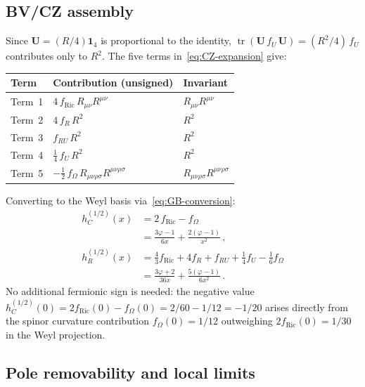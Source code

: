 \documentclass[aps,prd,twocolumn,superscriptaddress,nofootinbib,floatfix]{revtex4-2}
\theoremstyle{definition}
\theoremstyle{remark}
\newcommand{\Ricsq}{R_{\mu\nu}R^{\mu\nu}}
\newcommand{\Riemsq}{R_{\mu\nu\rho\sigma}R^{\mu\nu\rho\sigma}}
\newcommand{\tr}{\operatorname{tr}}
\begin{document}
\subsection{BV/CZ assembly}

Since $\mathbf{U} = (R/4)\mathbf{1}_4$ is proportional to the identity,
$\tr(\mathbf{U}\,f_U\,\mathbf{U}) = (R^2/4)\,f_U$ contributes only to
$R^2$. The five terms in~\eqref{eq:CZ-expansion} give:
\begin{center}
\renewcommand{\arraystretch}{1.15}
\begin{tabular}{@{}lll@{}}
  \toprule
  Term & Contribution (unsigned) & Invariant \\
  \midrule
  Term~1 & $4\,f_{\text{Ric}}\,\Ricsq$ & $\Ricsq$ \\
  Term~2 & $4\,f_R\,R^2$ & $R^2$ \\
  Term~3 & $f_{RU}\,R^2$ & $R^2$ \\
  Term~4 & $\tfrac{1}{4}\,f_U\,R^2$ & $R^2$ \\
  Term~5 & $-\tfrac{1}{2}\,f_\Omega\,\Riemsq$ & $\Riemsq$ \\
  \bottomrule
\end{tabular}
\end{center}

Converting to the Weyl basis via~\eqref{eq:GB-conversion}:
\begin{subequations}
\label{eq:dirac-ff}
\begin{align}
  h_C^{(1/2)}(x) &= 2\,f_{\text{Ric}} - f_\Omega
  \label{eq:hC12-assembly}\\
  &= \frac{3\varphi - 1}{6x} + \frac{2(\varphi - 1)}{x^2}\,,
  \label{eq:hC12}\\[4pt]
  h_R^{(1/2)}(x) &= \tfrac{4}{3}f_{\text{Ric}} + 4f_R
    + f_{RU} + \tfrac{1}{4}f_U - \tfrac{1}{6}f_\Omega
  \label{eq:hR12-assembly}\\
  &= \frac{3\varphi + 2}{36x} + \frac{5(\varphi - 1)}{6x^2}\,.
  \label{eq:hR12}
\end{align}
\end{subequations}
No additional fermionic sign is needed: the negative value
$h_C^{(1/2)}(0) = 2f_{\text{Ric}}(0) - f_\Omega(0)
= 2/60 - 1/12 = -1/20$ arises directly from the spinor curvature
contribution $f_\Omega(0) = 1/12$ outweighing $2f_{\text{Ric}}(0) = 1/30$
in the Weyl projection.

\subsection{Pole removability and local limits}
\end{document}
